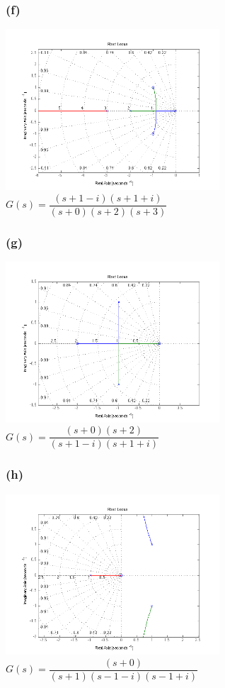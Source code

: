 \documentclass[letterpaper,10pt]{article}
\begin{document}
\subsubsection*{(f)}
\begin{center}
    \includegraphics[width=0.6\textwidth]{homework04-7-1-f.png} \\
   $G(s) = \dfrac{(s+1-i)(s+1+i)}{(s+0)(s+2)(s+3)}$
\end{center}
\subsubsection*{(g)}
\begin{center}
    \includegraphics[width=0.6\textwidth]{homework04-7-1-g.png} \\
   $G(s) = \dfrac{(s+0)(s+2)}{(s+1-i)(s+1+i)}$
\end{center}
\subsubsection*{(h)}
\begin{center}
    \includegraphics[width=0.6\textwidth]{homework04-7-1-h.png} \\
   $G(s) = \dfrac{(s+0)}{(s+1)(s-1-i)(s-1+i)}$
\end{center}
\end{document}
